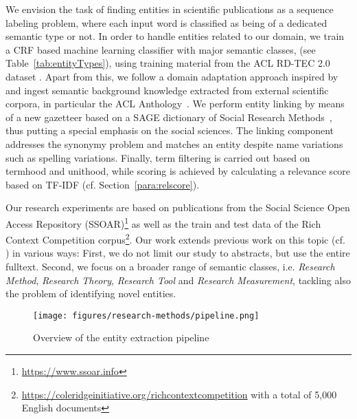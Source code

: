 We envision the task of finding entities in scientific publications as a sequence labeling problem, 
where each input word is classified as being of a dedicated semantic type or not.
In order to handle entities related to our domain, we train a CRF based machine learning classifier with major semantic classes,
(see Table~\ref{tab:entityTypes}), 
using training material from the ACL RD-TEC 2.0 dataset \cite{qasemizadeh2016acl}.
Apart from this, we follow a domain adaptation approach inspired by \cite{agerri2016robust} and ingest semantic background knowledge extracted from external scientific corpora, in particular the ACL Anthology~\cite{bird2008acl,gildea2018acl}.
We perform entity linking by means of a new gazetteer based on a SAGE dictionary of Social Research Methods~\cite{lewis2003sage}, thus putting a special emphasis on the social sciences. 
The linking component addresses the synonymy problem and matches an entity despite name variations such as spelling variations. 
Finally, term filtering is carried out based on termhood and unithood, while scoring is achieved by calculating a relevance score based on TF-IDF (cf. Section~\ref{para:relscore}).

Our research experiments are based on publications from the Social Science Open Access Repository (SSOAR)\footnote{\url{https://www.ssoar.info}} as well as the train and test data of the Rich Context Competition corpus\footnote{\url{https://coleridgeinitiative.org/richcontextcompetition}
with a total of 5,000 English documents}.
Our work extends previous work on this topic (cf. \cite{eckle2013automatically}) in various ways: First, we do not limit our study to abstracts, but use the entire fulltext. Second, we focus on a broader range of semantic classes, 
i.e. \textit{Research Method}, \textit{Research Theory}, \textit{Research Tool} and \textit{Research Measurement}, tackling also the problem of identifying novel entities.
 


\begin{figure}[t]
\centering
    \texttt{[image: figures/research-methods/pipeline.png]}
    \caption{Overview of the entity extraction pipeline}
\label{fig:pipeline}
\end{figure}



